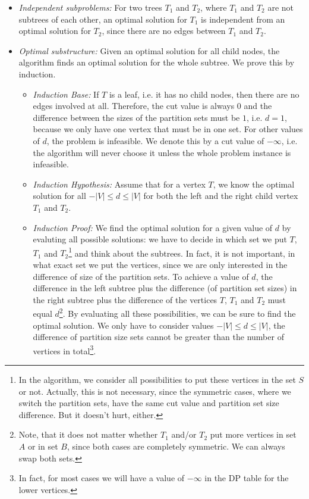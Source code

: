 \documentclass[12pt]{article}
\begin{document}
\begin{itemize}
	\item \emph{Independent subproblems:} For two trees $T_1$ and $T_2$, where $T_1$ and $T_2$ are not subtrees of each other, an optimal solution for $T_1$ is independent from an optimal solution for $T_2$, since there are no edges between $T_1$ and $T_2$.
	\item \emph{Optimal substructure:} Given an optimal solution for all child nodes, the algorithm finds an optimal solution for the whole subtree. We prove this by induction.
	\begin{itemize}
		\item \emph{Induction Base:} If $T$ is a leaf, i.e. it has no child nodes, then there are no edges involved at all. Therefore, the cut value is always $0$ and the difference between the sizes of the partition sets must be $1$, i.e. $d=1$, because we only have one vertex that must be in one set. For other values of $d$, the problem is infeasible. We denote this by a cut value of $-\infty$, i.e. the algorithm will never choose it unless the whole problem instance is infeasible.
		\item \emph{Induction Hypothesis:} Assume that for a vertex $T$, we know the optimal solution for all $-|V| \leq d \leq |V|$ for both the left and the right child vertex $T_1$ and $T_2$.
		\item \emph{Induction Proof:} We find the optimal solution for a given value of $d$ by evaluting all possible solutions: we have to decide in which set we put $T$, $T_1$ and $T_2$\footnote{In the algorithm, we consider all possibilities to put these vertices in the set $S$ or not. Actually, this is not necessary, since the symmetric cases, where we switch the partition sets, have the same cut value and partition set size difference. But it doesn't hurt, either.} and think about the subtrees. In fact, it is not important, in what exact set we put the vertices, since we are only interested in the difference of size of the partition sets. To achieve a value of $d$, the difference in the left subtree plus the difference (of partition set sizes) in the right subtree plus the difference of the vertices $T$, $T_1$ and $T_2$ must equal $d$\footnote{Note, that it does not matter whether $T_1$ and/or $T_2$ put more vertices in set $A$ or in set $B$, since both cases are completely symmetric. We can always swap both sets.}. By evaluating all these possibilities, we can be sure to find the optimal solution. We only have to consider values $-|V| \leq d \leq |V|$, the difference of partition size sets cannot be greater than the number of vertices in total\footnote{In fact, for most cases we will have a value of $-\infty$ in the DP table for the lower vertices.}.
	\end{itemize}
\end{itemize}
\end{document}
